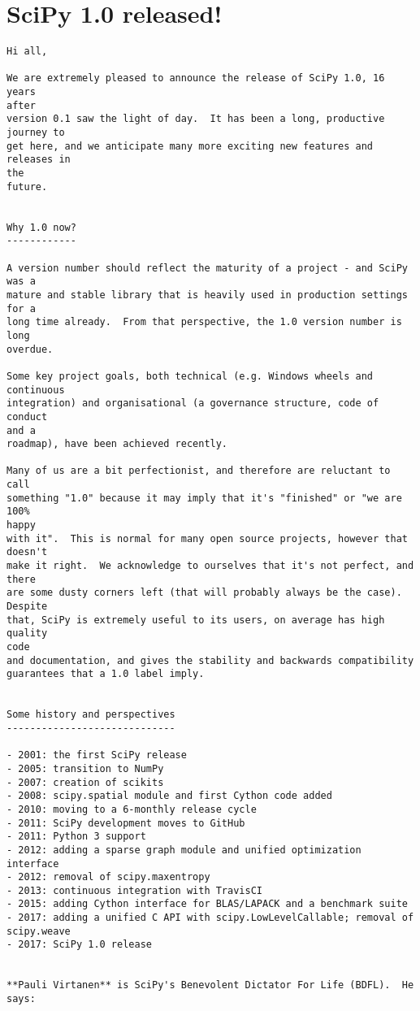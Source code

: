 \newpage
\section*{SciPy 1.0 released!}

\begin{verbatim}
Hi all,

We are extremely pleased to announce the release of SciPy 1.0, 16 years
after
version 0.1 saw the light of day.  It has been a long, productive journey to
get here, and we anticipate many more exciting new features and releases in
the
future.


Why 1.0 now?
------------

A version number should reflect the maturity of a project - and SciPy was a
mature and stable library that is heavily used in production settings for a
long time already.  From that perspective, the 1.0 version number is long
overdue.

Some key project goals, both technical (e.g. Windows wheels and continuous
integration) and organisational (a governance structure, code of conduct
and a
roadmap), have been achieved recently.

Many of us are a bit perfectionist, and therefore are reluctant to call
something "1.0" because it may imply that it's "finished" or "we are 100%
happy
with it".  This is normal for many open source projects, however that
doesn't
make it right.  We acknowledge to ourselves that it's not perfect, and there
are some dusty corners left (that will probably always be the case).
Despite
that, SciPy is extremely useful to its users, on average has high quality
code
and documentation, and gives the stability and backwards compatibility
guarantees that a 1.0 label imply.


Some history and perspectives
-----------------------------

- 2001: the first SciPy release
- 2005: transition to NumPy
- 2007: creation of scikits
- 2008: scipy.spatial module and first Cython code added
- 2010: moving to a 6-monthly release cycle
- 2011: SciPy development moves to GitHub
- 2011: Python 3 support
- 2012: adding a sparse graph module and unified optimization interface
- 2012: removal of scipy.maxentropy
- 2013: continuous integration with TravisCI
- 2015: adding Cython interface for BLAS/LAPACK and a benchmark suite
- 2017: adding a unified C API with scipy.LowLevelCallable; removal of
scipy.weave
- 2017: SciPy 1.0 release


**Pauli Virtanen** is SciPy's Benevolent Dictator For Life (BDFL).  He says:


\end{verbatim}
